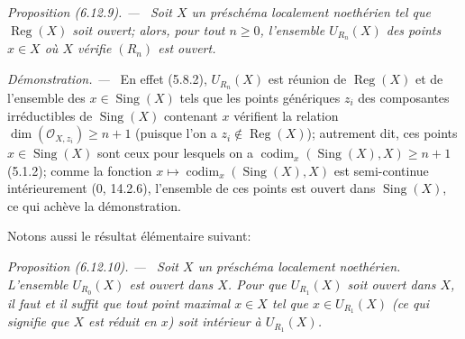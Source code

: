 \documentclass[10pt,oneside]{book}
\newenvironment{proposition}[1][]{%
  \par\medskip\noindent\itshape Proposition (#1). ---\ }{\par}
\newenvironment{proof}{%
  \par\medskip\noindent\textit{Démonstration. ---\ }}{\par}
\begin{document}
\begin{proposition}[6.12.9]
\label{IV.2.s6.12.9-fr}
Soit $X$ un préschéma localement noethérien tel que $\operatorname{Reg}(X)$
soit ouvert; alors, pour tout $n\geq0$, l'ensemble $U_{R_n}(X)$ des points
$x\in X$ où $X$ vérifie $(R_n)$ est ouvert.
\end{proposition}

\begin{proof}
En effet (5.8.2), $U_{R_n}(X)$ est réunion de $\operatorname{Reg}(X)$ et de
l'ensemble des $x\in\operatorname{Sing}(X)$ tels que les points génériques
$z_i$ des composantes irréductibles de $\operatorname{Sing}(X)$ contenant
$x$ vérifient la relation $\dim(\mathcal O_{X,z_i})\geq n+1$ (puisque l'on a
$z_i\notin\operatorname{Reg}(X)$); autrement dit, ces points
$x\in\operatorname{Sing}(X)$ sont ceux pour lesquels on a
$\operatorname{codim}_x(\operatorname{Sing}(X),X)\geq n+1$ (5.1.2); comme
la fonction $x\mapsto\operatorname{codim}_x(\operatorname{Sing}(X),X)$ est
semi-continue intérieurement (0, 14.2.6), l'ensemble de ces points est
ouvert dans $\operatorname{Sing}(X)$, ce qui achève la démonstration.
\end{proof}

Notons aussi le résultat élémentaire suivant:

\begin{proposition}[6.12.10]
\label{IV.2.s6.12.10-fr}
Soit $X$ un préschéma localement noethérien. L'ensemble $U_{R_0}(X)$ est
ouvert dans $X$. Pour que $U_{R_1}(X)$ soit ouvert dans $X$, il faut et il
suffit que tout point maximal $x\in X$ tel que $x\in U_{R_1}(X)$ (ce qui
signifie que $X$ est réduit en $x$) soit intérieur à $U_{R_1}(X)$.
\end{proposition}
\end{document}

